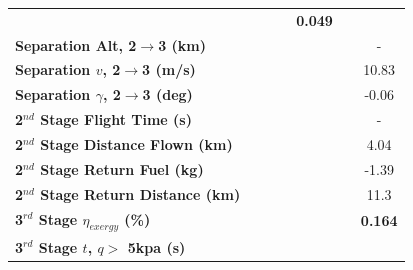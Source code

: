 \begin{table}[ht]
\begin{tabular}{l c c c c c c}
		& \textbf{\secondExergyEffIspStandard}
		& \textbf{\secondExergyEffIspOneHundredFive}
		& \textbf{\secondExergyEffIspOneHundredTen}
		& \textbf{0.049}
		\\
		\textbf{Separation Alt, 2$\rightarrow$3 (km)}
		& \secondthirdSeparationAltIspNinety
		& \secondthirdSeparationAltIspNinetyFive
		& \secondthirdSeparationAltIspStandard
		& \secondthirdSeparationAltIspOneHundredFive
		& \secondthirdSeparationAltIspOneHundredTen
		& -
		\\
		\textbf{Separation $v$, 2$\rightarrow$3 (m/s)}
		& \secondthirdSeparationvIspNinety
		& \secondthirdSeparationvIspNinetyFive
		& \secondthirdSeparationvIspStandard
		& \secondthirdSeparationvIspOneHundredFive
		& \secondthirdSeparationvIspOneHundredTen
		&10.83
		\\
		\textbf{Separation $\gamma$, 2$\rightarrow$3 (deg)}
		& \secondthirdSeparationgammaIspNinety
		& \secondthirdSeparationgammaIspNinetyFive
		& \secondthirdSeparationgammaIspStandard
		& \secondthirdSeparationgammaIspOneHundredFive
		& \secondthirdSeparationgammaIspOneHundredTen
		&-0.06
		\\
		\textbf{2$^{nd}$ Stage Flight Time (s)}
		& \secondFlightTimeIspNinety
		& \secondFlightTimeIspNinetyFive
		& \secondFlightTimeIspStandard
		& \secondFlightTimeIspOneHundredFive
		& \secondFlightTimeIspOneHundredTen
		& -
		\\
		\textbf{2$^{nd}$ Stage Distance Flown (km)}
		& \SecondDistIspNinety
		& \SecondDistIspNinetyFive
		& \SecondDistIspStandard
		& \SecondDistIspOneHundredFive
		& \SecondDistIspOneHundredTen
		&4.04
		\\
		\textbf{2$^{nd}$ Stage Return Fuel (kg)}
		& \returnFuelIspNinety
		& \returnFuelIspNinetyFive
		& \returnFuelIspStandard
		& \returnFuelIspOneHundredFive
		& \returnFuelIspOneHundredTen
		&-1.39
		\\
		\textbf{2$^{nd}$ Stage Return Distance (km)}
		& \returnDistIspNinety
		& \returnDistIspNinetyFive
		& \returnDistIspStandard
		& \returnDistIspOneHundredFive
		& \returnDistIspOneHundredTen
		&11.3
		\\
		\hline 
		\textbf{3$^{rd}$ Stage $\eta_{exergy}$ (\%)}
		& \textbf{\thirddExergyEffIspNinety}
		& \textbf{\thirddExergyEffIspNinetyFive}
		& \textbf{\thirddExergyEffIspStandard}
		& \textbf{\thirddExergyEffIspOneHundredFive}
		& \textbf{\thirddExergyEffIspOneHundredTen}
		& \textbf{0.164}
		\\
		\textbf{3$^{rd}$ Stage $t$, $q >$ 5kpa (s)}
		& \thirdqOverFiveIspNinety
		& \thirdqOverFiveIspNinetyFive

\end{tabular}
\end{table}
